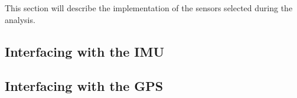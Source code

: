 \label{sub:implementation_of_sensors}
This section will describe the implementation of the sensors selected during the analysis.

\subsection{Interfacing with the IMU}\label{sec:interface_IMU}
\subsection{Interfacing with the GPS}\label{sec:interface_GPS}
